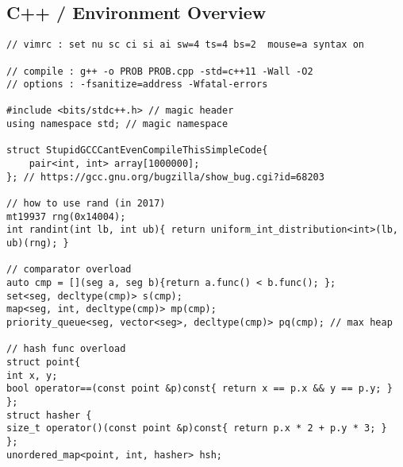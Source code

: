 \documentclass[landscape, 8pt, a4paper, oneside,  twocolumn]{extarticle}
\begin{document}
\subsection {C++ / Environment Overview}
\begin{verbatim}	
// vimrc : set nu sc ci si ai sw=4 ts=4 bs=2  mouse=a syntax on

// compile : g++ -o PROB PROB.cpp -std=c++11 -Wall -O2
// options : -fsanitize=address -Wfatal-errors

#include <bits/stdc++.h> // magic header
using namespace std; // magic namespace

struct StupidGCCCantEvenCompileThisSimpleCode{
	pair<int, int> array[1000000];
}; // https://gcc.gnu.org/bugzilla/show_bug.cgi?id=68203

// how to use rand (in 2017)
mt19937 rng(0x14004);
int randint(int lb, int ub){ return uniform_int_distribution<int>(lb, ub)(rng); }

// comparator overload
auto cmp = [](seg a, seg b){return a.func() < b.func(); };
set<seg, decltype(cmp)> s(cmp); 
map<seg, int, decltype(cmp)> mp(cmp);
priority_queue<seg, vector<seg>, decltype(cmp)> pq(cmp); // max heap

// hash func overload
struct point{
int x, y;
bool operator==(const point &p)const{ return x == p.x && y == p.y; }
};
struct hasher {
size_t operator()(const point &p)const{ return p.x * 2 + p.y * 3; }
};
unordered_map<point, int, hasher> hsh;

\end{verbatim}
\end{document}

